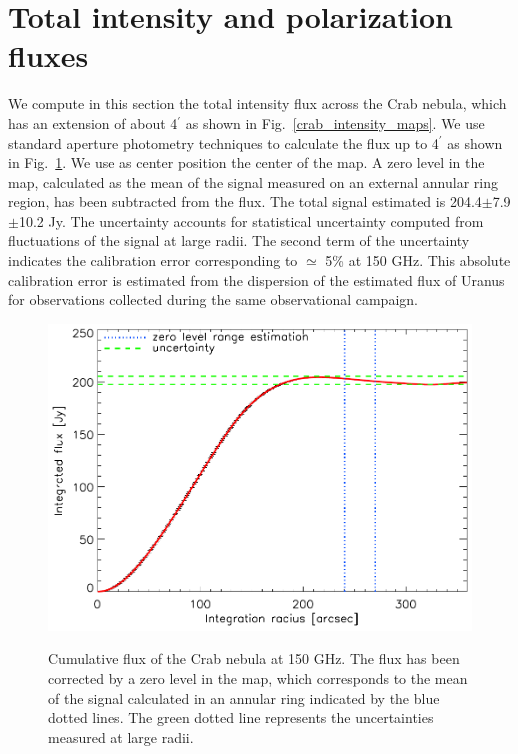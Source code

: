 \documentclass[twocolumn,traditabstract]{aa}
\begin{document}
\section{Total intensity and polarization fluxes}\label{sec:Polarization estimates in CMB experiments like beams}
We compute in this section the total intensity flux across the Crab nebula, which has an extension of about  4$^{\prime}$ as shown in Fig.~\ref{crab_intensity_maps}.
We use standard aperture photometry techniques to calculate the flux up to 4$^{\prime}$ as shown in Fig.~\ref{crab_integrated_flux}. We use as center position the center of the map. A zero level in the map, calculated as the mean of the signal measured on an external annular ring region, has been subtracted from the flux. The total signal estimated is 204.4$\pm$7.9$\pm$10.2 Jy. The uncertainty accounts for statistical uncertainty computed from fluctuations of the signal at large radii. The second term of the uncertainty indicates the calibration error corresponding to  $\simeq$ 5\% at 150 GHz. This absolute calibration error is estimated from the dispersion of the estimated flux of Uranus for observations collected during the same observational campaign.

\begin{figure}[h!]
  \centering
     { \includegraphics[width=0.85\linewidth,keepaspectratio]{figures/Crab_integrated_flux_2mm.pdf}}
     \caption{Cumulative flux of the Crab nebula at 150 GHz. The flux has been corrected by a zero level in the map, which corresponds to the mean of the signal calculated in an annular ring indicated by the blue dotted lines. The green dotted line represents the uncertainties measured at large radii.}
\label{crab_integrated_flux}
\end{figure}
\end{document}
